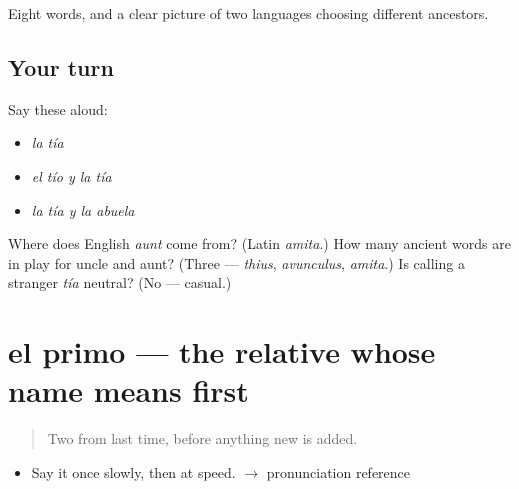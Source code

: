 \begin{grammarlens}[title={What you've built}]
Eight words, and a clear picture of two languages choosing different ancestors.
\end{grammarlens}

\subsection*{Your turn}
Say these aloud:

\begin{itemize}
\raggedright
  \item \emph{la tía}
  \item \emph{el tío y la tía}
  \item \emph{la tía y la abuela}
\end{itemize}

\begin{tcolorbox}[breakable,colback=teal!4,colframe=teal!35!black,title={Before you move on}]
Where does English \emph{aunt} come from? (Latin \emph{amita}.) How many ancient words are in play for uncle and aunt? (Three --- \emph{thius}, \emph{avunculus}, \emph{amita}.) Is calling a stranger \emph{tía} neutral? (No --- casual.)
\end{tcolorbox}
\section[el primo]{el primo --- the relative whose name means first}

\label{lesson:ES-C307-primo}



\begin{quote}
Two from last time, before anything new is added.
\end{quote}

\begin{sounds}
\begin{itemize}
\raggedright
  \item Say it once slowly, then at speed. $\to$ pronunciation reference
\end{itemize}
\end{sounds}


